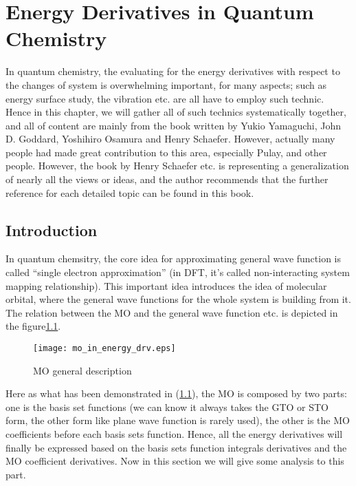 %
%
%
%
%
\chapter{Energy Derivatives in Quantum Chemistry}
%
%
%
In quantum chemistry, the evaluating for the energy derivatives with
respect to the changes of system is overwhelming important, for many
aspects; such as energy surface study, the vibration etc. are all have
to employ such technic. Hence in this chapter, we will gather all of
such technics systematically together, and all of content are mainly
from the book written by  Yukio Yamaguchi, John D. Goddard, Yoshihiro
Osamura and Henry
Schaefer\cite{New_Dimension_for_Derivatives_Calculation}. However,
actually many people had made great contribution to this area,
especially Pulay\cite{Pulay1, Pulay2, Pulay3, Pulay4, Pulay5,
Pulay6, pulay:5043}, and other people\cite{bishop:3515,
RevModPhys.45.22, jorgensen:334, king:5645, meyer:2109}. However, the
book by Henry Schaefer etc. is representing a generalization of
nearly all the views or ideas, and the author recommends that
the further reference for each detailed topic can be found in this
book. 


\section{Introduction}
In quantum chemsitry, the core idea for approximating general wave
function is called ``single electron approximation'' (in DFT, it's
called non-interacting system mapping relationship). This important
idea introduces the idea of molecular orbital, where the general wave
functions for the whole system is building from it. The relation
between the MO and the general wave function etc. is depicted in the
figure\ref{derivatives_fig:1}.
\begin{figure}[bhtp]
 \centering
 \texttt{[image: mo\_in\_energy\_drv.eps]}
 \caption{MO general description}
 \label{derivatives_fig:1}
\end{figure}

Here as what has been demonstrated in (\ref{derivatives_fig:1}), the
MO is composed by two parts: one is the basis set functions (we can
know it always takes the GTO or STO form, the other form like plane
wave function is rarely used), the other is the MO coefficients
before each basis sets function. Hence, all the energy derivatives
will finally be expressed based on the basis sets function integrals
derivatives and the MO coefficient derivatives. Now in this section
we will give some analysis to this part.

